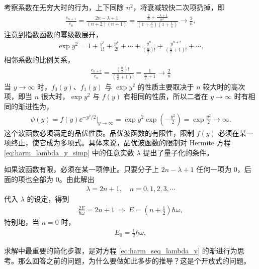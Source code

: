 考察系数在无穷大时的行为，上下同除 $n^2$，将衰减较快二次项扔掉，即
\begin{align}
    \frac{c_{n+1}}{c_n} = \frac{2n - \lambda + 1} { (n+2) (n+1)} = \frac{ \frac{2}{n} + \frac{-\lambda+1}{n^2} } { \left(1+\frac 2n\right) \left(1+\frac1n\right) } \rightarrow \frac 2n,
\end{align}
注意到指数函数的幂级数展开，
\begin{align}
    \exp y^2 = 1 + \frac{y^2}{1!} + \frac{y^4}{2!} + \cdots + \frac{y^n}{\left(\frac n2\right)!} + \frac{y^{n+2}}{\left(\frac n2 +1\right)!} + \cdots,
\end{align}
相邻系数的比例关系，
\begin{align}
    \frac{c_{n+2}}{c_n} = \frac{\left(\frac n2\right)!} {\left(\frac n2 + 1\right)!} = \frac1{\frac n2 +1} \rightarrow \frac 2n
\end{align}
当 $y\rightarrow\infty$ 时，$f_0(y)$、$f_1(y)$ 与 $\exp y^2$ 的性质主要取决于 $n$ 较大时的高次项，即当 $n$ 很大时，$\exp y^2$ 与 $f(y)$ 有相同的性质，所以二者在 $y\rightarrow\infty$ 时有相同的渐进性为，
\begin{align}
    \psi(y) = f(y) \ee^{-y^2/2} |_{y\rightarrow \infty} = \exp y^2 \exp \left(-\frac{y^2}2\right) = \exp \frac{y^2}2 \rightarrow \infty.
\end{align}
这个波函数必须满足的品优性质。品优波函数的有限性，限制 $f(y)$ 必须在某一项终止，使它成为多项式。具体来说，品优波函数的限制对 Hermite 方程
\eqref{eq:harm_lambda_y_simp}
中的任意实数 $\lambda$ 提出了量子化的条件。

如果波函数有限，必须在某一项停止。只要分子上 $2n - \lambda +1$ 任何一项为 0，后面的项也全部为 0。由此解出
\begin{align}
    \lambda = 2n +1, \quad n = 0, 1, 2, 3, \cdots
\end{align}
代入 $\lambda$ 的设定，得到
\begin{align}
    \frac{2E}{\hbar\omega} = 2n+1  \ \Rightarrow \ E = \left(n+\frac12\right)\hbar\omega,
\end{align}
特别地，当 $n=0$ 时，
\begin{align}
    E_0 = \frac12\hbar \omega,
\end{align}

求解中最重要的简化步骤，是对方程 \eqref{eq:harm_seq_lambda_y} 的渐进行为思考。那么回答之前的问题，为什么要做如此多步的推导？这是个开放式的问题。


